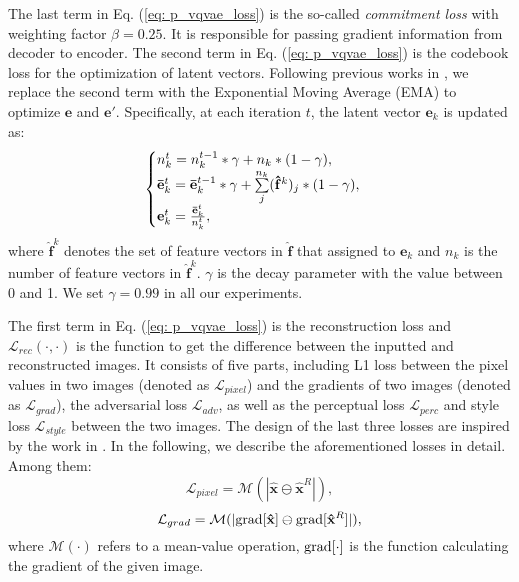 \documentclass[10pt,twocolumn,letterpaper]{article}
\begin{document}
The last term in Eq. (\ref{eq: p_vqvae_loss}) is the so-called \emph{commitment loss} \cite{van2017neural} with weighting factor $\beta = 0.25$. It is responsible for passing gradient information from decoder to encoder.
The second term in Eq. (\ref{eq: p_vqvae_loss}) is the codebook loss for the optimization of latent vectors. Following previous works in \cite{van2017neural,razavi2019generating}, we replace the second term with the Exponential Moving Average (EMA) to optimize $\mathbf{e}$ and $\mathbf{e'}$. Specifically, at each iteration $t$, the latent vector $\mathbf{e}_{k}$ is updated as:
\begin{equation}
	\begin{cases}
		n_{k}^{t} = n_{k}^{t-1} * \gamma + n_{k} * (1-\gamma),\\
		\mathbf{\Bar{e}}_{k}^{t} = \mathbf{\Bar{e}}_{k}^{t-1} * \gamma + \sum\limits_{j}^{n_{k}}(\mathbf{\hat{f}}^{k})_{j} * (1-\gamma), \\
		\mathbf{e}^{t}_{k} = \frac{\mathbf{\Bar{e}}_{k}^{t}}{n_{k}^{t}},
	\end{cases}
	\label{eq: ema_for_latent_embedding}
\end{equation}
where $\mathbf{\hat{f}}^{k}$ denotes the set of feature vectors in $\mathbf{\hat{f}}$ that assigned to $\mathbf{e}_{k}$ and $n_{k}$ is the number of feature vectors in $\mathbf{\hat{f}}^{k}$. $\gamma$ is the decay parameter with the value between 0 and 1. We set $\gamma=0.99$ in all our experiments.




The first term in Eq. (\ref{eq: p_vqvae_loss}) is the reconstruction loss and $\mathcal{L}_{rec}(\cdot, \cdot)$ is the function to get the difference between the inputted and reconstructed images. It consists of five parts, including L1 loss between the pixel values in two images (denoted as $\mathcal{L}_{pixel}$) and the gradients of two images (denoted as $\mathcal{L}_{grad}$), the adversarial loss \cite{goodfellow2014generative} $\mathcal{L}_{adv}$, as well as the perceptual loss \cite{johnson2016perceptual} $\mathcal{L}_{perc}$ and style loss\cite{gatys2016image} $\mathcal{L}_{style}$ between the two images. The design of the last three losses are inspired by the work in \cite{nazeri2019edgeconnect}. In the following, we describe the aforementioned losses in detail. Among them:
\begin{equation}
    \mathcal{L}_{pixel} = \mathcal{M}(|\mathbf{\hat{x}} \ominus \mathbf{\hat{x}}^R|),
	\label{eq: loss_pixel}
\end{equation}
\begin{equation}
    \mathcal{L}_{grad} = \mathcal{M}(|{\rm grad}[\mathbf{\hat{x}}] \ominus {\rm grad}[\mathbf{\hat{x}}^R]|),
	\label{eq: loss_gradient}
\end{equation}
where $\mathcal{M}(\cdot)$ refers to a mean-value operation, ${\rm grad}[\cdot]$ is the function calculating the gradient of the given image. 
\end{document}
